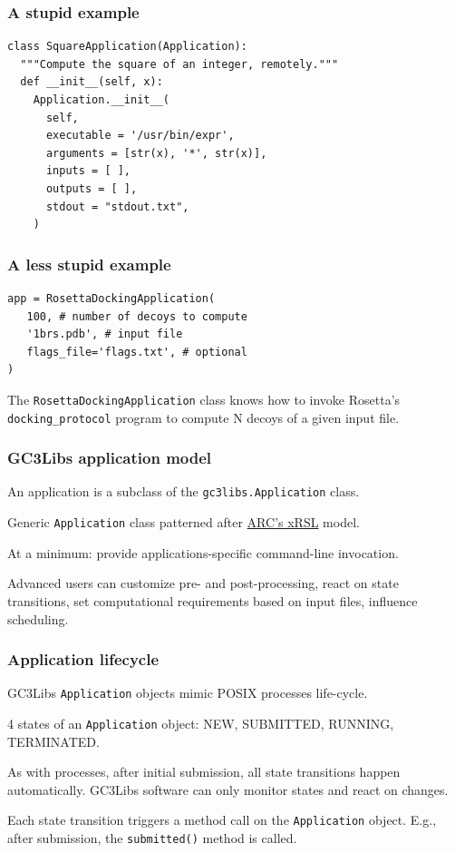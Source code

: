 \documentclass[presentation]{beamer}
\begin{document}
\begin{frame}[fragile]
\frametitle{A stupid example}
\label{sec-4}

\begin{verbatim}
class SquareApplication(Application):
  """Compute the square of an integer, remotely."""
  def __init__(self, x):
    Application.__init__(
      self,
      executable = '/usr/bin/expr',
      arguments = [str(x), '*', str(x)],
      inputs = [ ],
      outputs = [ ],
      stdout = "stdout.txt",
    )
\end{verbatim}
\end{frame}
\begin{frame}[fragile]
\frametitle{A less stupid example}
\label{sec-5}

\begin{verbatim}
app = RosettaDockingApplication(
   100, # number of decoys to compute
   '1brs.pdb', # input file
   flags_file='flags.txt', # optional
)
\end{verbatim}

  The \texttt{RosettaDockingApplication} class knows how to invoke Rosetta's
  \texttt{docking\_protocol} program to compute N decoys of a given input file.
\end{frame}
\begin{frame}
\frametitle{GC3Libs application model}
\label{sec-6}

  An application is a subclass of the \texttt{gc3libs.Application} class.

  Generic \texttt{Application} class patterned after \href{http://www.nordugrid.org/documents/xrsl.pdf}{ARC's xRSL} model.

  At a minimum: provide applications-specific command-line invocation.

  Advanced users can customize pre- and post-processing, react on
  state transitions, set computational requirements based on input
  files, influence scheduling.
\end{frame}
\begin{frame}
\frametitle{Application lifecycle}
\label{sec-7}

  GC3Libs \texttt{Application} objects mimic POSIX processes life-cycle.

  4 states of an \texttt{Application} object: NEW, SUBMITTED, RUNNING, TERMINATED.

  As with processes, after initial submission, all state transitions
  happen automatically.  GC3Libs software can only monitor states and
  react on changes.

  Each state transition triggers a method call on the \texttt{Application}
  object.  E.g., after submission, the \texttt{submitted()} method is called.
\end{frame}
\end{document}
